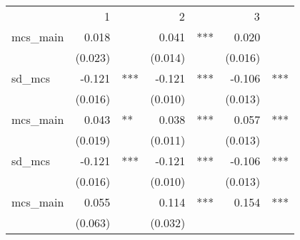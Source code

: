\documentclass{article}
\begin{document}
\begin{table}[!h]
\centering
\begin{tabular}{lllllll}
\cline{1-7}
\multicolumn{1}{r}{} &
  \multicolumn{2}{c}{1} &
  \multicolumn{2}{c}{2} &
  \multicolumn{2}{c}{3} \\
\cline{1-7}
\multicolumn{1}{l}{mcs\_main} &
  \multicolumn{1}{r}{0.018} &
  \multicolumn{1}{l}{} &
  \multicolumn{1}{r}{0.041} &
  \multicolumn{1}{l}{***} &
  \multicolumn{1}{r}{0.020} &
  \multicolumn{1}{l}{} \\
\multicolumn{1}{l}{} &
  \multicolumn{1}{r}{(0.023)} &
  \multicolumn{1}{l}{} &
  \multicolumn{1}{r}{(0.014)} &
  \multicolumn{1}{l}{} &
  \multicolumn{1}{r}{(0.016)} &
  \multicolumn{1}{l}{} \\
\multicolumn{1}{l}{sd\_mcs} &
  \multicolumn{1}{r}{-0.121} &
  \multicolumn{1}{l}{***} &
  \multicolumn{1}{r}{-0.121} &
  \multicolumn{1}{l}{***} &
  \multicolumn{1}{r}{-0.106} &
  \multicolumn{1}{l}{***} \\
\multicolumn{1}{l}{} &
  \multicolumn{1}{r}{(0.016)} &
  \multicolumn{1}{l}{} &
  \multicolumn{1}{r}{(0.010)} &
  \multicolumn{1}{l}{} &
  \multicolumn{1}{r}{(0.013)} &
  \multicolumn{1}{l}{} \\
\multicolumn{1}{l}{mcs\_main} &
  \multicolumn{1}{r}{0.043} &
  \multicolumn{1}{l}{**} &
  \multicolumn{1}{r}{0.038} &
  \multicolumn{1}{l}{***} &
  \multicolumn{1}{r}{0.057} &
  \multicolumn{1}{l}{***} \\
\multicolumn{1}{l}{} &
  \multicolumn{1}{r}{(0.019)} &
  \multicolumn{1}{l}{} &
  \multicolumn{1}{r}{(0.011)} &
  \multicolumn{1}{l}{} &
  \multicolumn{1}{r}{(0.013)} &
  \multicolumn{1}{l}{} \\
\multicolumn{1}{l}{sd\_mcs} &
  \multicolumn{1}{r}{-0.121} &
  \multicolumn{1}{l}{***} &
  \multicolumn{1}{r}{-0.121} &
  \multicolumn{1}{l}{***} &
  \multicolumn{1}{r}{-0.106} &
  \multicolumn{1}{l}{***} \\
\multicolumn{1}{l}{} &
  \multicolumn{1}{r}{(0.016)} &
  \multicolumn{1}{l}{} &
  \multicolumn{1}{r}{(0.010)} &
  \multicolumn{1}{l}{} &
  \multicolumn{1}{r}{(0.013)} &
  \multicolumn{1}{l}{} \\
\multicolumn{1}{l}{mcs\_main} &
  \multicolumn{1}{r}{0.055} &
  \multicolumn{1}{l}{} &
  \multicolumn{1}{r}{0.114} &
  \multicolumn{1}{l}{***} &
  \multicolumn{1}{r}{0.154} &
  \multicolumn{1}{l}{***} \\
\multicolumn{1}{l}{} &
  \multicolumn{1}{r}{(0.063)} &
  \multicolumn{1}{l}{} &
  \multicolumn{1}{r}{(0.032)} &
  \multicolumn{1}{l}{} &

\end{tabular}
\end{table}
\end{document}
